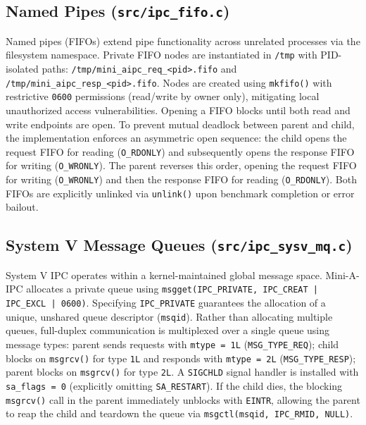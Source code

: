 \subsection{Named Pipes (\texttt{src/ipc\_fifo.c})}
Named pipes (FIFOs) extend pipe functionality across unrelated processes via the filesystem namespace.
Private FIFO nodes are instantiated in \texttt{/tmp} with PID-isolated paths: \texttt{/tmp/mini\_aipc\_req\_<pid>.fifo} and \texttt{/tmp/mini\_aipc\_resp\_<pid>.fifo}. Nodes are created using \texttt{mkfifo()} with restrictive \texttt{0600} permissions (read/write by owner only), mitigating local unauthorized access vulnerabilities.
Opening a FIFO blocks until both read and write endpoints are open. To prevent mutual deadlock between parent and child, the implementation enforces an asymmetric open sequence: the child opens the request FIFO for reading (\texttt{O\_RDONLY}) and subsequently opens the response FIFO for writing (\texttt{O\_WRONLY}). The parent reverses this order, opening the request FIFO for writing (\texttt{O\_WRONLY}) and then the response FIFO for reading (\texttt{O\_RDONLY}). Both FIFOs are explicitly unlinked via \texttt{unlink()} upon benchmark completion or error bailout.

\subsection{System V Message Queues (\texttt{src/ipc\_sysv\_mq.c})}
System V IPC operates within a kernel-maintained global message space.
Mini-A-IPC allocates a private queue using \texttt{msgget(IPC\_PRIVATE, IPC\_CREAT | IPC\_EXCL | 0600)}. Specifying \texttt{IPC\_PRIVATE} guarantees the allocation of a unique, unshared queue descriptor (\texttt{msqid}).
Rather than allocating multiple queues, full-duplex communication is multiplexed over a single queue using message types: parent sends requests with \texttt{mtype = 1L} (\texttt{MSG\_TYPE\_REQ}); child blocks on \texttt{msgrcv()} for type \texttt{1L} and responds with \texttt{mtype = 2L} (\texttt{MSG\_TYPE\_RESP}); parent blocks on \texttt{msgrcv()} for type \texttt{2L}.
A \texttt{SIGCHLD} signal handler is installed with \texttt{sa\_flags = 0} (explicitly omitting \texttt{SA\_RESTART}). If the child dies, the blocking \texttt{msgrcv()} call in the parent immediately unblocks with \texttt{EINTR}, allowing the parent to reap the child and teardown the queue via \texttt{msgctl(msqid, IPC\_RMID, NULL)}.

